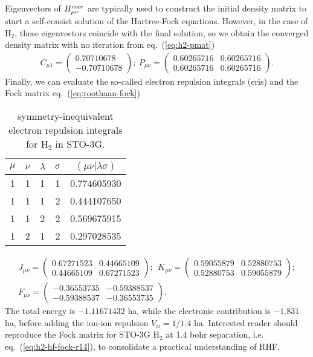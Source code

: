 Eigenvectors of $H^{\text{core}}_{\mu\nu}$ are typically used to construct the initial density matrix to start a self-consist solution of the Hartree-Fock equations. However, in the case of H$_2$, these eigenvectors coincide with the final solution, so we obtain the converged density matrix with no iteration from eq.~(\ref{eq:h2-pmat})
\begin{align}
C_{\mu 1} = \left(\begin{array}{c}
0.70710678 \\ -0.70710678
\end{array}\right);
~P_{\mu\nu} = \left(\begin{array}{cc}
0.60265716 & 0.60265716 \\
0.60265716 & 0.60265716
\end{array}\right).
\end{align}
Finally, we can evaluate the so-called electron repulsion integrals (eris) and the Fock matrix eq.~(\ref{eq:roothaan-fock})
\begin{table}[h]
\centering
\begin{tabular}{ccccc}
\toprule
$\mu$ & $\nu$ & $\lambda$ & $\sigma$ & $(\mu\nu|\lambda\sigma)$\\
\midrule
1 & 1 & 1 & 1 & 0.774605930 \\
1 & 1 & 1 & 2 & 0.444107650 \\
1 & 1 & 2 & 2 & 0.569675915 \\
1 & 2 & 1 & 2 & 0.297028535 \\
\bottomrule
\end{tabular}
\caption{symmetry-inequivalent electron repulsion integrals for H$_2$ in STO-3G.}
\end{table}
\begin{align}
J_{\mu\nu} = \left(\begin{array}{cc}
0.67271523 & 0.44665109 \\
0.44665109 & 0.67271523
\end{array}\right); ~~
K_{\mu\nu} = \left(\begin{array}{cc}
0.59055879 & 0.52880753 \\
0.52880753 & 0.59055879
\end{array}\right);\\
F_{\mu\nu} = \left(\begin{array}{cc}
-0.36553735 & -0.59388537 \\
-0.59388537 & -0.36553735
\end{array}\right).\label{eq:h2-hf-fock-r14}
\end{align}
The total energy is $-1.11671432$ ha, while the electronic contribution is $-1.831$ ha, before adding the ion-ion repulsion $V_{ii}=1/1.4$ ha. Interested reader should reproduce the Fock matrix for STO-3G H$_2$ at 1.4 bohr separation, i.e. eq.~(\ref{eq:h2-hf-fock-r14}), to consolidate a practical understanding of RHF.

